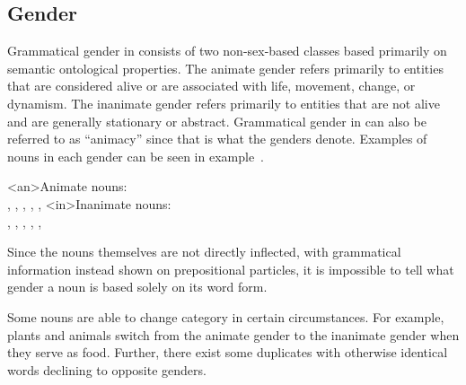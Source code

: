 \subsection{Gender}
\label{subsec:tvk-nouns-gender}

Grammatical gender in \langtvk{} consists of two\autocite{wals-30} non-sex-based\autocite{wals-31} classes based primarily on semantic ontological properties\autocite{wals-32}. The animate gender refers primarily to entities that are considered alive or are associated with life, movement, change, or dynamism. The inanimate gender refers primarily to entities that are not alive and are generally stationary or abstract. Grammatical gender in \langtvk{} can also be referred to as \enquote{animacy} since that is what the genders denote. Examples of nouns in each gender can be seen in example~.

	\a<an>Animate nouns:\\
		 ,  ,  ,  ,  ,  
	\a<in>Inanimate nouns:\\
		 ,  ,  ,  ,  ,  
\xe

Since the nouns themselves are not directly inflected, with grammatical information instead shown on prepositional particles, it is impossible to tell what gender a noun is based solely on its word form.

Some nouns are able to change category in certain circumstances. For example, plants and animals switch from the animate gender to the inanimate gender when they serve as food. Further, there exist some duplicates with otherwise identical words declining to opposite genders.

